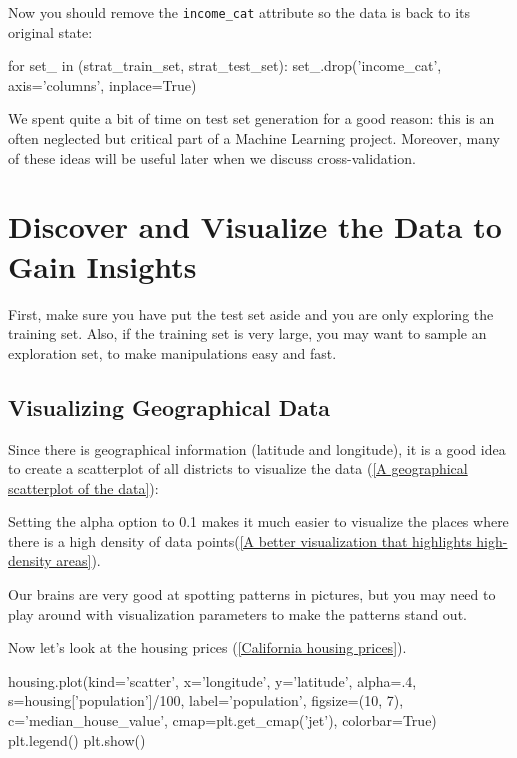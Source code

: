 Now you should remove the \verb|income_cat| attribute so the data is back to its original
state:
\begin{pyc}
for set_ in (strat_train_set, strat_test_set):
    set_.drop('income_cat', axis='columns', inplace=True)
\end{pyc}

We spent quite a bit of time on test set generation for a good reason: this is an often
neglected but critical part of a Machine Learning project. Moreover, many of these
ideas will be useful later when we discuss cross-validation.

\section{Discover and Visualize the Data to Gain Insights}
First, make sure you have put the test set aside and you are only exploring the training set. Also, if the training set is very large, you may want to sample an exploration
set, to make manipulations easy and fast.

\subsection{Visualizing Geographical Data}

Since there is geographical information (latitude and longitude), it is a good idea to
create a scatterplot of all districts to visualize the data (\autoref{A geographical scatterplot of the data}):

Setting the alpha option to 0.1 makes it much easier to visualize the places
where there is a high density of data points(\autoref{A better visualization that highlights high-density areas}).


Our brains are very good at spotting patterns in pictures, but you may need to play
around with visualization parameters to make the patterns stand out.

Now let’s look at the housing prices (\autoref{California housing prices}).
\begin{pyc}
housing.plot(kind='scatter', x='longitude', y='latitude', alpha=.4, s=housing['population']/100,
             label='population', figsize=(10, 7),
             c='median_house_value', cmap=plt.get_cmap('jet'), colorbar=True)
plt.legend()
plt.show()
\end{pyc}


